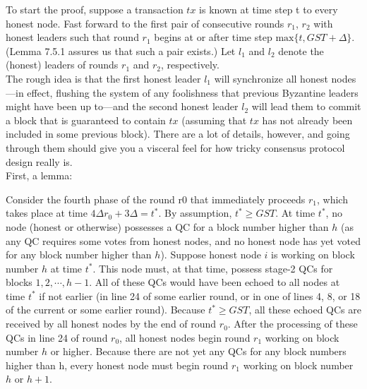 To start the proof, suppose a transaction $tx$ is known at time step t to every honest
node. Fast forward to the first pair of consecutive rounds $r_1$, $r_2$ with honest leaders such
that round $r_1$ begins at or after time step $\text{max}\{t, GST + \Delta\}$. (Lemma 7.5.1 assures us that
such a pair exists.) Let $l_1$ and $l_2$ denote the (honest) leaders of rounds $r_1$ and $r_2$, respectively.\\
The rough idea is that the first honest leader $l_1$ will synchronize all honest nodes—in
effect, flushing the system of any foolishness that previous Byzantine leaders might have been
up to—and the second honest leader $l_2$ will lead them to commit a block that is guaranteed
to contain $tx$ (assuming that $tx$ has not already been included in some previous block).
There are a lot of details, however, and going through them should give you a visceral feel
for how tricky consensus protocol design really is.\\
First, a lemma:
\begin{myproof}

\end{myproof}
Consider the fourth phase of the round r0 that immediately proceeds $r_1$, which takes
place at time $4\Delta r_0 + 3\Delta = t^*$. By assumption, $t^* \geq GST$. At time $t^*$, no node (honest or
otherwise) possesses a QC for a block number higher than $h$ (as any QC requires some votes
from honest nodes, and no honest node has yet voted for any block number higher than $h$).
Suppose honest node $i$ is working on block number $h$ at time $t^*$. This node must, at that
time, possess stage-2 QCs for blocks $1, 2, \cdots, h−1$. All of these QCs would have been echoed
to all nodes at time $t^*$ if not earlier (in line 24 of some earlier round, or in one of lines 4, 8,
or 18 of the current or some earlier round). Because $t^* \geq GST$, all these echoed QCs are
received by all honest nodes by the end of round $r_0$. After the processing of these QCs in
line 24 of round $r_0$, all honest nodes begin round $r_1$ working on block number $h$ or higher.
Because there are not yet any QCs for any block numbers higher than h, every honest node
must begin round $r_1$ working on block number $h$ or $h + 1$.\\


